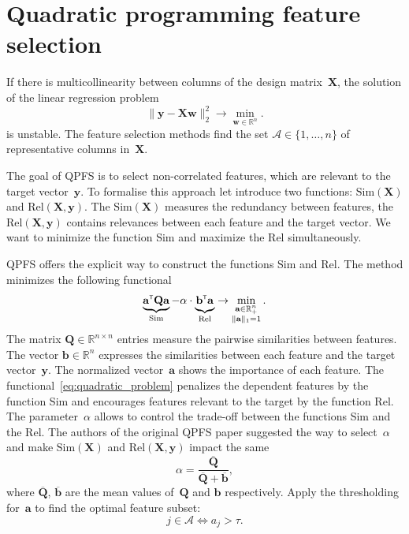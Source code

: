 \documentclass[
11pt,%
tightenlines,%
twoside,%
onecolumn,%
nofloats,%
nobibnotes,%
nofootinbib,%
superscriptaddress,%
noshowpacs,%
centertags]%
{revtex4}
\newcommand{\ba}{\mathbf{a}}
\newcommand{\bb}{\mathbf{b}}
\newcommand{\bw}{\mathbf{w}}
\newcommand{\by}{\mathbf{y}}
\newcommand{\cA}{\mathcal{A}}
\newcommand{\bQ}{\mathbf{Q}}
\newcommand{\bbR}{\mathbb{R}}
\newcommand{\bX}{\mathbf{X}}
\newcommand{\T}{{\text{\tiny\sffamily\upshape\mdseries T}}}
\begin{document}
\section{Quadratic programming feature selection}
If there is multicollinearity between columns of the design matrix~$\bX$, the solution of the linear regression problem
\begin{equation}
\| \by - \bX \bw\|_2^2 \rightarrow\min_{\bw \in \bbR^{n}}.
\label{eq:linear_regression}
\end{equation}
is unstable. 
The feature selection methods find the set $\cA \in \{1, \dots, n\}$ of representative columns in~$\bX$. 

The goal of QPFS is to select non-correlated features, which are relevant to the target vector~$\by$.
To formalise this approach let introduce two functions: $\text{Sim}(\bX)$ and $\text{Rel}(\bX, \by)$. 
The $\text{Sim}(\bX)$ measures the redundancy between features, the $\text{Rel}(\bX, \by)$ contains relevances between each feature and the target vector. 
We want to minimize the function Sim and maximize the Rel simultaneously.

QPFS offers the explicit way to construct the functions Sim and Rel. 
The method minimizes the following functional
\begin{equation}
\underbrace{\ba^{\T} \bQ \ba}_{\text{Sim}} - \alpha \cdot \underbrace{\vphantom{()} \mathbf{b}^{\T} \ba}_{\text{Rel}} \rightarrow \min_{\substack{\ba \in \bbR^n_+ \\ \|\ba\|_1=1}}.
\label{eq:quadratic_problem}
\end{equation}
The matrix $\bQ \in \bbR^{n \times n}$ entries measure the pairwise similarities between features. 
The vector $\mathbf{b} \in \bbR^n$ expresses the similarities between each feature and the target vector~$\by$.
The normalized vector~$\ba$ shows the importance of each feature. 
The functional~\eqref{eq:quadratic_problem} penalizes the dependent features by the function Sim and encourages features relevant to the target by the function Rel. 
The parameter~$\alpha$ allows to control the trade-off between the functions Sim and the Rel.
The authors of the original QPFS paper suggested the way to select~$\alpha$ and make $\text{Sim}(\bX)$ and $\text{Rel}(\bX, \by)$ impact the same
\begin{equation*}
\alpha = \frac{\overline{\bQ}}{\overline{\bQ} + \overline{\bb}},
\end{equation*}
where $\overline{\bQ}$, $\overline{\bb}$ are the mean values of~$\bQ$ and $\bb$ respectively.
Apply the thresholding for~$\ba$ to find the optimal feature subset:
\[
j \in \mathcal{A} \Leftrightarrow a_j > \tau.
\]
\end{document}
